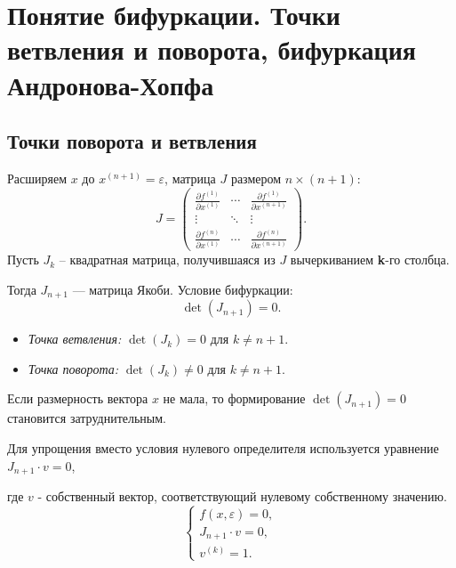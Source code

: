 	\newpage
	\section{Понятие бифуркации. Точки ветвления и поворота, бифуркация Андронова-Хопфа}
	
	\subsection{Точки поворота и ветвления}
	
	Расширяем \(x\) до \( x^{(n+1)} = \varepsilon \), матрица \(J\) размером \( n \times (n+1) \):
	\begin{equation}
		J = \begin{pmatrix}
			\frac{\partial f^{(1)}}{\partial x^{(1)}} & \cdots & \frac{\partial f^{(1)}}{\partial x^{(n+1)}} \\
			\vdots & \ddots & \vdots \\
			\frac{\partial f^{(n)}}{\partial x^{(1)}} & \cdots & \frac{\partial f^{(n)}}{\partial x^{(n+1)}}
		\end{pmatrix}.
	\end{equation}
	Пусть \(J_k\) – квадратная матрица, получившаяся из \(J\) вычеркиванием \textbf{k}-го столбца. 
	\par
	Тогда \(J_{n+1}\) — матрица Якоби. Условие бифуркации:
	\begin{equation}
		\det(J_{n+1}) = 0.
	\end{equation}
	\begin{itemize}
		\item \textit{Точка ветвления:} \(\det(J_k) = 0\) для \( k \neq n+1 \).
		\item \textit{Точка поворота:} \(\det(J_k) \neq 0\) для \( k \neq n+1 \).
	\end{itemize}
	Если размерность вектора \( x \) не мала, то формирование \(\det(J_{n+1}) = 0\) становится затруднительным. 
	\par
	Для упрощения вместо условия нулевого определителя используется уравнение \( J_{n+1} \cdot v = 0 \), 
	\par
	где \( v \) - собственный вектор, соответствующий нулевому собственному значению.
	\begin{equation}
		\begin{cases}
			f(x, \varepsilon) = 0, \\
			J_{n+1} \cdot v = 0, \\
			v^{(k)} = 1.
		\end{cases}
	\end{equation}

